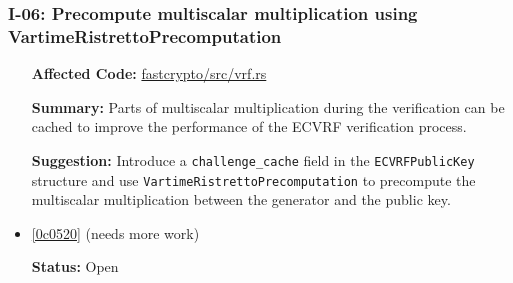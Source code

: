 \subsubsection*{I-06: Precompute multiscalar multiplication using VartimeRistrettoPrecomputation}
\begin{itemize}[align=left]
\item[\textbf{Affected Code:}] \href{https://github.com/MystenLabs/fastcrypto/blob/963205c6d0538fe548b8b10037cf87a53af6f424/fastcrypto/src/vrf.rs}{fastcrypto/src/vrf.rs}
\item[\textbf{Summary:}] Parts of multiscalar multiplication during the verification can be cached to improve the performance of the ECVRF verification process.
\item[\textbf{Suggestion:}] Introduce a \lstinline{challenge_cache} field in the \lstinline{ECVRFPublicKey} structure and use \lstinline{VartimeRistrettoPrecomputation} to precompute the multiscalar multiplication between the generator and the public key. 
\item[\textbf{Suggested Fix:}] \href{https://github.com/MystenLabs/fastcrypto/pull/543/commits/0c05200998a89fc177a26a8b9d4254bd0e0070de}{[0c0520]} (needs more work)
\item[\textbf{Status:}] Open
\end{itemize}
